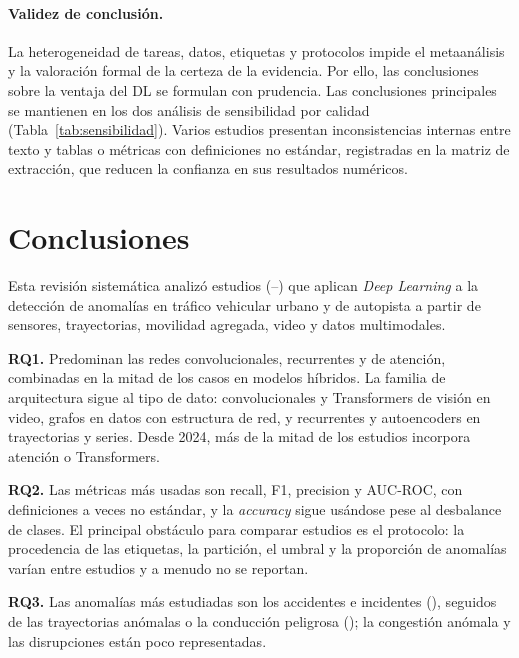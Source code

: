 \documentclass[12pt, a4paper]{article}
\begin{document}
\paragraph{Validez de conclusión.} La heterogeneidad de tareas, datos, etiquetas y protocolos impide el metaanálisis y la valoración formal de la certeza de la evidencia. Por ello, las conclusiones sobre la ventaja del DL se formulan con prudencia. Las conclusiones principales se mantienen en los dos análisis de sensibilidad por calidad (Tabla~\ref{tab:sensibilidad}). Varios estudios presentan inconsistencias internas entre texto y tablas o métricas con definiciones no estándar, registradas en la matriz de extracción, que reducen la confianza en sus resultados numéricos.

\section{Conclusiones}
\label{sec:conclusiones}

Esta revisión sistemática analizó \Nestudios{} estudios (\AnioMin--\AnioMax) que aplican \textit{Deep Learning} a la detección de anomalías en tráfico vehicular urbano y de autopista a partir de sensores, trayectorias, movilidad agregada, video y datos multimodales.

\textbf{RQ1.} Predominan las redes convolucionales, recurrentes y de atención, combinadas en la mitad de los casos en modelos híbridos. La familia de arquitectura sigue al tipo de dato: convolucionales y Transformers de visión en video, grafos en datos con estructura de red, y recurrentes y autoencoders en trayectorias y series. Desde 2024, más de la mitad de los estudios incorpora atención o Transformers.

\textbf{RQ2.} Las métricas más usadas son recall, F1, precision y AUC-ROC, con definiciones a veces no estándar, y la \textit{accuracy} sigue usándose pese al desbalance de clases. El principal obstáculo para comparar estudios es el protocolo: la procedencia de las etiquetas, la partición, el umbral y la proporción de anomalías varían entre estudios y a menudo no se reportan.

\textbf{RQ3.} Las anomalías más estudiadas son los accidentes e incidentes (\PcatA), seguidos de las trayectorias anómalas o la conducción peligrosa (\PcatC); la congestión anómala y las disrupciones están poco representadas.
\end{document}
